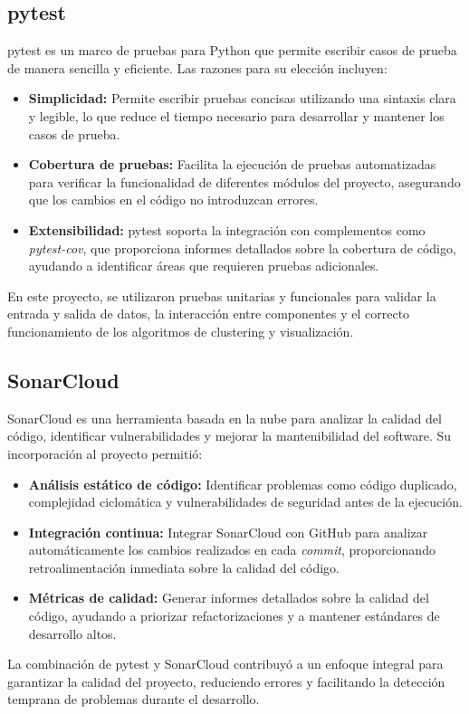 \subsection*{pytest}

pytest es un marco de pruebas para Python que permite escribir casos de prueba de manera sencilla y eficiente. Las razones para su elección incluyen:

\begin{itemize}
    \item \textbf{Simplicidad:} Permite escribir pruebas concisas utilizando una sintaxis clara y legible, lo que reduce el tiempo necesario para desarrollar y mantener los casos de prueba.
    \item \textbf{Cobertura de pruebas:} Facilita la ejecución de pruebas automatizadas para verificar la funcionalidad de diferentes módulos del proyecto, asegurando que los cambios en el código no introduzcan errores.
    \item \textbf{Extensibilidad:} pytest soporta la integración con complementos como \textit{pytest-cov}, que proporciona informes detallados sobre la cobertura de código, ayudando a identificar áreas que requieren pruebas adicionales.
\end{itemize}

En este proyecto, se utilizaron pruebas unitarias y funcionales para validar la entrada y salida de datos, la interacción entre componentes y el correcto funcionamiento de los algoritmos de clustering y visualización.

\subsection*{SonarCloud}

SonarCloud es una herramienta basada en la nube para analizar la calidad del código, identificar vulnerabilidades y mejorar la mantenibilidad del software. Su incorporación al proyecto permitió:

\begin{itemize}
    \item \textbf{Análisis estático de código:} Identificar problemas como código duplicado, complejidad ciclomática y vulnerabilidades de seguridad antes de la ejecución.
    \item \textbf{Integración continua:} Integrar SonarCloud con GitHub para analizar automáticamente los cambios realizados en cada \textit{commit}, proporcionando retroalimentación inmediata sobre la calidad del código.
    \item \textbf{Métricas de calidad:} Generar informes detallados sobre la calidad del código, ayudando a priorizar refactorizaciones y a mantener estándares de desarrollo altos.
\end{itemize}

La combinación de pytest y SonarCloud contribuyó a un enfoque integral para garantizar la calidad del proyecto, reduciendo errores y facilitando la detección temprana de problemas durante el desarrollo.






